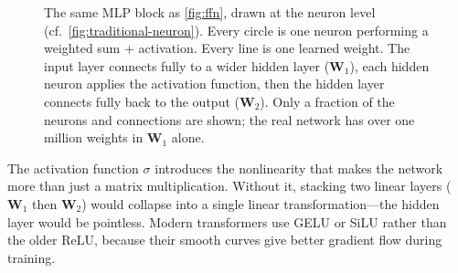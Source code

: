 \begin{figure}[htbp]
\caption{The same MLP block as \cref{fig:ffn}, drawn at the neuron
  level (cf.~\cref{fig:traditional-neuron}). Every circle is one
  neuron performing a weighted sum + activation. Every line is one
  learned weight. The input layer connects fully to a wider hidden
  layer ($\bm{W}_1$), each hidden neuron applies the activation
  function, then the hidden layer connects fully back to the output
  ($\bm{W}_2$). Only a fraction of the neurons and connections are
  shown; the real network has over one million weights in $\bm{W}_1$
  alone.}
\label{fig:ffn-neurons}
\end{figure}

The activation function $\sigma$ introduces the nonlinearity that
makes the network more than just a matrix multiplication. Without it,
stacking two linear layers ($\bm{W}_1$ then $\bm{W}_2$) would
collapse into a single linear transformation---the hidden layer would
be pointless. Modern transformers use GELU or SiLU rather than the
older ReLU, because their smooth curves give better gradient flow
during training.

